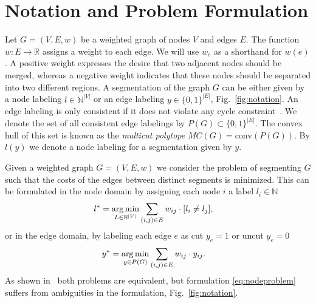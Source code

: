 \section{Notation and Problem Formulation}\label{sec:problem_formulation}
Let $G=(V,E, w)$ be a weighted graph of nodes $V$ and edges $E$.
%
The function $w : E \rightarrow \mathbb{R}$ assigns a weight to each edge.
We will use $w_e$ as a shorthand for $w(e)$.
A positive weight expresses the desire that two adjacent nodes should
be merged, whereas a negative weight indicates
that these nodes should be separated into two different regions.
%
%
%
A segmentation of the graph $G$ can be either given by a
node labeling $l \in \mathbb{N}^{|V|}$
or an edge labeling $y \in\{0,1\}^{|E|}$, \cf Fig.~\ref{fig:notation}.
An edge labeling is only consistent if it does not violate any cycle constraint~\cite{kappes_2013_arxiv}.
We denote the set of all consistent edge labelings by $P(G)\subset\{0,1\}^{|E|}$.
The convex hull of this set is known as the \emph{multicut polytope} $MC(G) = \textrm{conv}(P(G))$.
%
By $l(y)$ we denote a node labeling for a segmentation given by $y$.

Given a weighted graph $G=(V,E,w)$ we consider the problem of segmenting $G$ such that the costs
of the edges between distinct segments is minimized. This can be formulated in the node domain
by assigning each node $i$ a label $l_i \in \mathbb{N}$
\begin{align}
  l^* &= \operatorname*{arg\,min}_{L \in \mathbb{N}^{|V|}} \sum_{ (i,j) \in E } w_{ij} \cdot [l_{i} \neq l_{j}], \label{eq:nodeproblem}
\end{align} 
or in the edge domain, by labeling each edge $e$ as cut $y_e=1$ or uncut $y_e=0$ 
\begin{align}
  y^* &= \argmin_{y \in P(G)} \sum_{ (i,j) \in E } w_{ij} \cdot y_{ij} \label{eq:edgeproblem}.%
\end{align}
As shown in~\cite{kappes_2013_arxiv}  both problems are equivalent, but formulation \ref{eq:nodeproblem}
suffers from ambiguities in the formulation, \cf Fig.~\ref{fig:notation}. 

%
